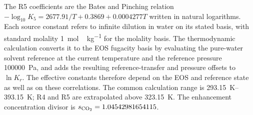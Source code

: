 The R5 coefficients are the Bates and Pinching relation $-\log_{10}K_5=2677.91/T+0.3869+0.0004277T$ written in natural logarithms.
Each source constant refers to infinite dilution in water on its stated basis, with standard molality \qty{1}{mol\,kg^{-1}} for the molality basis.
The thermodynamic calculation converts it to the EOS fugacity basis by evaluating the pure-water solvent reference at the current temperature and the reference pressure \qty{100000}{Pa}, and adds the resulting reference-transfer and pressure offsets to $\ln K_r$.
The effective constants therefore depend on the EOS and reference state as well as on these correlations.
The common calculation range is \qtyrange{293.15}{393.15}{K}; R4 and R5 are extrapolated above \qty{323.15}{K}.
The enhancement concentration divisor is $s_{\COtwo}=1.04542981654115$.

\clearpage
\begingroup
\makeatletter
\setlength{\@fptop}{0pt}
\makeatother

\clearpage
\endgroup
